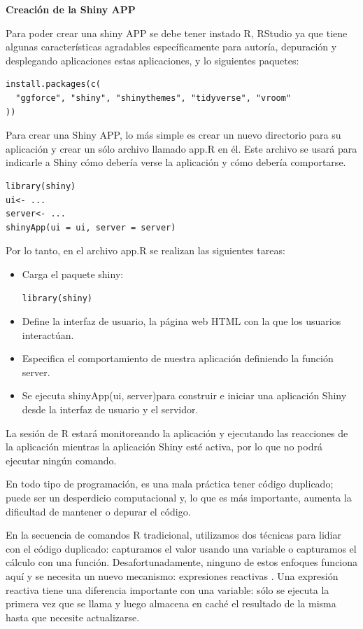 \textbf{Creación de la Shiny APP}


Para poder crear una shiny APP se debe tener instado R, RStudio ya que tiene algunas características agradables específicamente para autoría, depuración y desplegando aplicaciones estas aplicaciones, y lo siguientes paquetes:

\begin{lstlisting}
install.packages(c(
  "ggforce", "shiny", "shinythemes", "tidyverse", "vroom" 
))
\end{lstlisting}

Para crear una Shiny APP, lo más simple es crear un nuevo directorio para su aplicación y crear un sólo archivo llamado app.R en él. Este archivo se usará para indicarle a Shiny cómo debería verse la aplicación y cómo debería comportarse.

\begin{lstlisting}[frame=single]
library(shiny)
ui<- ...
server<- ...
shinyApp(ui = ui, server = server)
\end{lstlisting}


Por lo tanto, en el archivo app.R se realizan las siguientes tareas:

\begin{itemize}
\item Carga el paquete shiny: 
\begin{lstlisting} 
library(shiny) 
\end{lstlisting}
\item Define la interfaz de usuario, la página web HTML con la que los usuarios interactúan.
\item Especifica el comportamiento de nuestra aplicación definiendo la  función server. 
\item Se ejecuta shinyApp(ui, server)para construir e iniciar una aplicación Shiny desde la interfaz de usuario y el servidor.
\end{itemize}


La sesión de R estará monitoreando la aplicación y ejecutando las reacciones de la aplicación mientras la aplicación Shiny esté activa, por lo que no podrá ejecutar ningún comando.

En todo tipo de programación, es una mala práctica tener código duplicado; puede ser un desperdicio computacional y, lo que es más importante, aumenta la dificultad de mantener o depurar el código.

En la secuencia de comandos R tradicional, utilizamos dos técnicas para lidiar con el código duplicado: capturamos el valor usando una variable o capturamos el cálculo con una función. Desafortunadamente, ninguno de estos enfoques funciona aquí y se necesita un nuevo mecanismo: expresiones reactivas . Una expresión reactiva tiene una diferencia importante con una variable: sólo se ejecuta la primera vez que se llama y luego almacena en caché el resultado de la misma hasta que necesite actualizarse.


